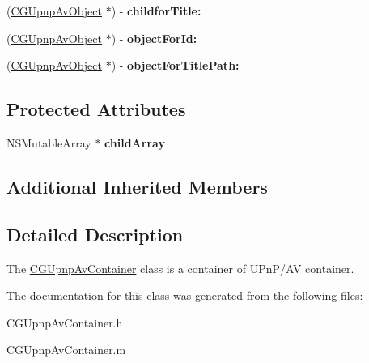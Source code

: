 \begin{DoxyCompactItemize}
\item 
\hypertarget{interface_c_g_upnp_av_container_ab77edf9e8f3306e12ff9916c8c3635f0}{(\hyperlink{interface_c_g_upnp_av_object}{C\-G\-Upnp\-Av\-Object} $\ast$) -\/ {\bfseries childfor\-Title\-:}}\label{interface_c_g_upnp_av_container_ab77edf9e8f3306e12ff9916c8c3635f0}

\item 
\hypertarget{interface_c_g_upnp_av_container_a19b9f234ac567554edc9dfcd7e92e3a2}{(\hyperlink{interface_c_g_upnp_av_object}{C\-G\-Upnp\-Av\-Object} $\ast$) -\/ {\bfseries object\-For\-Id\-:}}\label{interface_c_g_upnp_av_container_a19b9f234ac567554edc9dfcd7e92e3a2}

\item 
\hypertarget{interface_c_g_upnp_av_container_afc394e83d1391627d0c646069c0d8f2d}{(\hyperlink{interface_c_g_upnp_av_object}{C\-G\-Upnp\-Av\-Object} $\ast$) -\/ {\bfseries object\-For\-Title\-Path\-:}}\label{interface_c_g_upnp_av_container_afc394e83d1391627d0c646069c0d8f2d}

\end{DoxyCompactItemize}
\subsection*{Protected Attributes}
\begin{DoxyCompactItemize}
\item 
\hypertarget{interface_c_g_upnp_av_container_ade460f03a8cedb1b3c442d8ac2ea20d5}{N\-S\-Mutable\-Array $\ast$ {\bfseries child\-Array}}\label{interface_c_g_upnp_av_container_ade460f03a8cedb1b3c442d8ac2ea20d5}

\end{DoxyCompactItemize}
\subsection*{Additional Inherited Members}


\subsection{Detailed Description}
The \hyperlink{interface_c_g_upnp_av_container}{C\-G\-Upnp\-Av\-Container} class is a container of U\-Pn\-P/\-A\-V container. 

The documentation for this class was generated from the following files\-:\begin{DoxyCompactItemize}
\item 
C\-G\-Upnp\-Av\-Container.\-h\item 
C\-G\-Upnp\-Av\-Container.\-m\end{DoxyCompactItemize}

